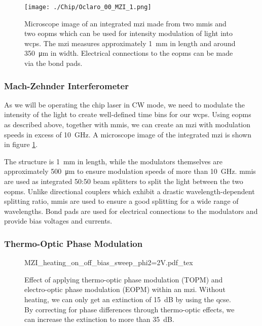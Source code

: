 \begin{figure}[tp]
	\centering
	\texttt{[image: ./Chip/Oclaro\_00\_MZI\_1.png]}
	\caption[Microscope image of an integrated Mach-Zehnder interferometer]{Microscope image of an  integrated \acl{mzi} made from two \acsp{mmi} and two \acsp{eopm} which can be used for intensity modulation of light into \acp{wcp}. The \ac{mzi} measures approximately \SI{1}{\mm} in length and around \SI{350}{\micro\metre} in width. Electrical connections to the \acsp{eopm} can be made via the bond pads.}
	\label{fig:InP_MZI}
\end{figure}

\subsubsection{Mach-Zehnder Interferometer}

As we will be operating the chip laser in \ac{CW} mode, we need to modulate the intensity of the light to create well-defined time bins for our \acp{wcp}. Using \acp{eopm} as described above, together with \acp{mmi}, we can create an \ac{mzi} with modulation speeds in excess of \SI{10}{GHz}. A microscope image of the integrated \ac{mzi} is shown in figure \ref{fig:InP_MZI}.

The structure is \SI{1}{mm} in length, while the modulators themselves are approximately \SI{500}{\um} to ensure modulation speeds of more than \SI{10}{GHz}. \Acp{mmi} are used as integrated {50:50} beam splitters to split the light between the two \acp{eopm}. Unlike directional couplers which exhibit a drastic wavelength-dependent splitting ratio, \acp{mmi} are used to ensure a good splitting for a wide range of wavelengths. Bond pads are used for electrical connections to the modulators and provide bias voltages and currents.

\subsubsection{Thermo-Optic Phase Modulation}

\begin{figure}[tp]
	\centering
	\small
	\def\svgwidth{0.8\textwidth} 
	{MZI_heating_on_off_bias_sweep_phi2=2V.pdf_tex}
	\caption[MZI optimisation through thermo-optic phase modulation]{Effect of applying thermo-optic phase modulation (TOPM) and electro-optic phase modulation (EOPM) within an \ac{mzi}. Without heating, we can only get an extinction of \SI{15}{dB} by using the \ac{qcse}. By correcting for phase differences through thermo-optic effects, we can increase the extinction to more than \SI{35}{dB}.} %
	\label{fig:mzi_heating}
\end{figure}


